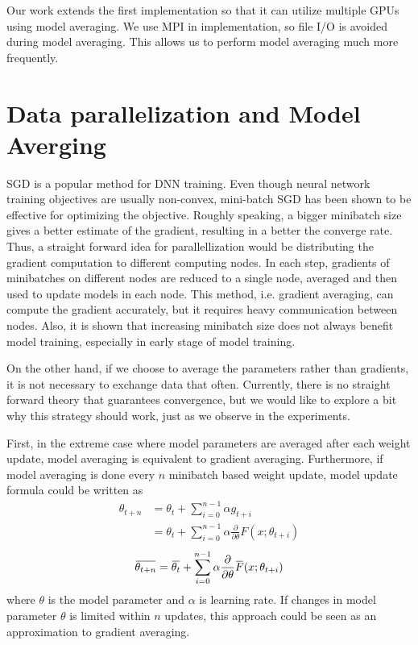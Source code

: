 \documentclass{article}
\newcommand{\overbar}[1]{\mkern 1.5mu\overline{\mkern-1.5mu#1\mkern-1.5mu}\mkern 1.5mu}
\begin{document}
Our work extends the first implementation so that it can utilize multiple GPUs using model averaging. We use MPI 
in implementation, so file I/O is avoided during model averaging. This allows us to perform model averaging much
more frequently. 

\section{Data parallelization and Model Averging}
SGD is a popular method for DNN training. Even though neural network training objectives are usually non-convex, 
mini-batch SGD has been shown to be effective for optimizing the objective\cite{seide2011conversational}. 
Roughly speaking, a bigger minibatch size gives a better estimate of the gradient, resulting in a better the converge rate. 
Thus, a straight forward idea for parallellization would be distributing the gradient computation to different computing
nodes. In each step, gradients of minibatches on different nodes are reduced to a single node, averaged and then used to 
update models in each node. This method, i.e. gradient averaging, can compute the gradient accurately, but it requires 
heavy communication between nodes.
Also, it is shown that increasing minibatch size does not always benefit model training\cite{seide2011conversational}, 
especially in early stage of model training.

On the other hand, if we choose to average the parameters rather than gradients, it is not necessary to exchange data that often. 
Currently, there is no straight forward theory that guarantees convergence, but we would like to explore a bit why this strategy 
should work, just as we observe in the experiments.

First, in the extreme case where model parameters are averaged after each weight update, model averaging is equivalent to 
gradient averaging. Furthermore, if model averaging is done every $n$ minibatch based weight update, model update formula could
be written as
\begin{equation}
\begin{split}
\theta_{t+n} &= \theta_{t} +\sum_{i=0}^{n-1} \alpha g_{t+i}\\
&= \theta_{t} +\sum_{i=0}^{n-1} \alpha \frac{\partial}{\partial\theta} F(x;\theta_{t+i})
\end{split}
\end{equation}
\begin{equation}
\overbar{\theta_{t+n}} = \overbar{\theta_{t}} +\sum_{i=0}^{n-1} \alpha \frac{\partial}{\partial\theta} \overbar{F}(x;\theta_{t+i})
\end{equation}
where $\theta$ is the model parameter and $\alpha$ is learning rate. If changes in model parameter $\theta$ is limited 
within $n$ updates, this approach could be seen as an approximation to gradient averaging.
\end{document}
